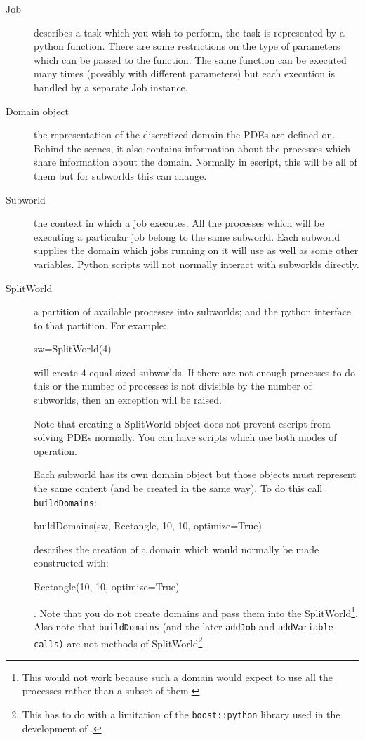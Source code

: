 \begin{description}
 \item[Job] describes a task which you wish to perform, the task is represented by a python function.
There are some restrictions on the type of parameters which can be passed to the function. 
The same function can be executed many times (possibly with different parameters) but each execution is 
handled by a separate Job instance.
\item[Domain object] the representation of the discretized domain the PDEs are defined on.
Behind the scenes, it also contains information about the processes which share information about the domain.
Normally in escript, this will be all of them but for subworlds this can change.
\item[Subworld] the context in which a job executes.
All the processes which will be executing a particular job belong to the same subworld.
Each subworld supplies the domain which jobs running on it will use as well as some other variables.
Python scripts will not normally interact with subworlds directly.
\item[SplitWorld] a partition of available processes into subworlds; and the python interface to that partition.
For example:
\begin{python}
sw=SplitWorld(4) 
\end{python}
will create 4 equal sized subworlds.
If there are not enough processes to do this or the number of processes is not divisible by the 
number of subworlds, then an exception will be raised.

Note that creating a SplitWorld object does not prevent escript from solving PDEs normally.
You can have scripts which use both modes of operation.

Each subworld has its own domain object but those objects must represent the same content (and be created in the same way).
To do this call \texttt{buildDomains}:
\begin{python}
buildDomains(sw, Rectangle,  10, 10, optimize=True)
\end{python}
describes the creation of a domain which would normally be made constructed with:
\begin{python}
Rectangle(10, 10, optimize=True)
\end{python}.
Note that you do not create domains and pass them into the SplitWorld\footnote{
This would not work because such a domain would expect to use all the processes rather than a subset of them.}.
Also note that \texttt{buildDomains} (and the later \texttt{addJob} and \texttt{addVariable calls)} are not methods of SplitWorld\footnote{
This has to do with a limitation of the \texttt{boost::python} library used in the development of \escript.}.


\end{description}
